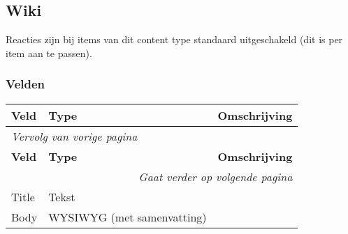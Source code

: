 \subsection{Wiki}
\label{sec:content-wiki}
Reacties zijn bij items van dit content type standaard uitgeschakeld (dit is per item aan te passen).

\subsubsection{Velden}
  \begin{longtable}{| p{3.75cm}|p{3.75cm}|p{7.50cm}|}
  \hline
  \rowcolor{tableheader}
  \textbf{Veld} & \textbf{Type} & \textbf{Omschrijving}  \tabularnewline
  \hline
\endfirsthead
\multicolumn{3}{l}{\textit{Vervolg van vorige pagina}} \\
\hline
\rowcolor{tableheader}
  \textbf{Veld} & \textbf{Type} & \textbf{Omschrijving}  \tabularnewline
  \hline
\hline
\endhead
\multicolumn{3}{r}{\textit{Gaat verder op volgende pagina}} \\
\endfoot
\hline
\endlastfoot
  \raggedright{Title} & \raggedright{Tekst} & \raggedright{}  \tabularnewline
  \hline
  \raggedright{Body} & \raggedright{WYSIWYG (met samenvatting)} & \raggedright{}  \tabularnewline
  \hline
  \end{longtable}

